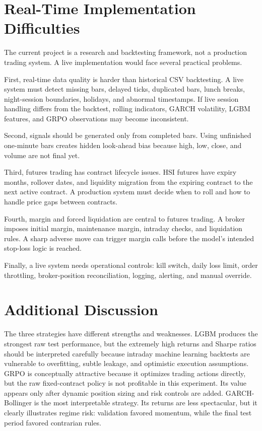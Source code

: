 \documentclass[11pt,a4paper]{article}
\begin{document}
\section{Real-Time Implementation Difficulties}

The current project is a research and backtesting framework, not a production trading system. A live implementation would face several practical problems.

First, real-time data quality is harder than historical CSV backtesting. A live system must detect missing bars, delayed ticks, duplicated bars, lunch breaks, night-session boundaries, holidays, and abnormal timestamps. If live session handling differs from the backtest, rolling indicators, GARCH volatility, LGBM features, and GRPO observations may become inconsistent.

Second, signals should be generated only from completed bars. Using unfinished one-minute bars creates hidden look-ahead bias because high, low, close, and volume are not final yet.

Third, futures trading has contract lifecycle issues. HSI futures have expiry months, rollover dates, and liquidity migration from the expiring contract to the next active contract. A production system must decide when to roll and how to handle price gaps between contracts.

Fourth, margin and forced liquidation are central to futures trading. A broker imposes initial margin, maintenance margin, intraday checks, and liquidation rules. A sharp adverse move can trigger margin calls before the model's intended stop-loss logic is reached.

Finally, a live system needs operational controls: kill switch, daily loss limit, order throttling, broker-position reconciliation, logging, alerting, and manual override.

\section{Additional Discussion}

The three strategies have different strengths and weaknesses. LGBM produces the strongest raw test performance, but the extremely high returns and Sharpe ratios should be interpreted carefully because intraday machine learning backtests are vulnerable to overfitting, subtle leakage, and optimistic execution assumptions. GRPO is conceptually attractive because it optimizes trading actions directly, but the raw fixed-contract policy is not profitable in this experiment. Its value appears only after dynamic position sizing and risk controls are added. GARCH-Bollinger is the most interpretable strategy. Its returns are less spectacular, but it clearly illustrates regime risk: validation favored momentum, while the final test period favored contrarian rules.
\end{document}
